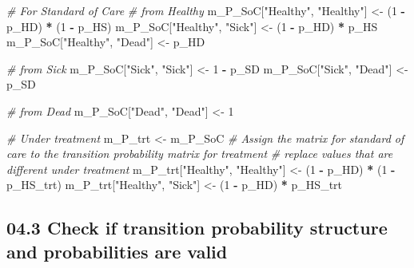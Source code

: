 \documentclass[
]{article}
\newenvironment{Shaded}{\begin{snugshade}}{\end{snugshade}}
\newcommand{\CommentTok}[1]{\textcolor[rgb]{0.56,0.35,0.01}{\textit{#1}}}
\newcommand{\DecValTok}[1]{\textcolor[rgb]{0.00,0.00,0.81}{#1}}
\newcommand{\NormalTok}[1]{#1}
\newcommand{\OperatorTok}[1]{\textcolor[rgb]{0.81,0.36,0.00}{\textbf{#1}}}
\newcommand{\StringTok}[1]{\textcolor[rgb]{0.31,0.60,0.02}{#1}}
\begin{document}
\begin{Shaded}
\begin{Highlighting}[]
\CommentTok{# For Standard of Care }
\CommentTok{# from Healthy}
\NormalTok{m_P_SoC[}\StringTok{"Healthy"}\NormalTok{, }\StringTok{"Healthy"}\NormalTok{] <-}\StringTok{ }\NormalTok{(}\DecValTok{1} \OperatorTok{-}\StringTok{ }\NormalTok{p_HD) }\OperatorTok{*}\StringTok{ }\NormalTok{(}\DecValTok{1} \OperatorTok{-}\StringTok{ }\NormalTok{p_HS)}
\NormalTok{m_P_SoC[}\StringTok{"Healthy"}\NormalTok{, }\StringTok{"Sick"}\NormalTok{]    <-}\StringTok{ }\NormalTok{(}\DecValTok{1} \OperatorTok{-}\StringTok{ }\NormalTok{p_HD) }\OperatorTok{*}\StringTok{ }\NormalTok{p_HS}
\NormalTok{m_P_SoC[}\StringTok{"Healthy"}\NormalTok{, }\StringTok{"Dead"}\NormalTok{]    <-}\StringTok{ }\NormalTok{p_HD}

\CommentTok{# from Sick}
\NormalTok{m_P_SoC[}\StringTok{"Sick"}\NormalTok{, }\StringTok{"Sick"}\NormalTok{] <-}\StringTok{ }\DecValTok{1} \OperatorTok{-}\StringTok{ }\NormalTok{p_SD}
\NormalTok{m_P_SoC[}\StringTok{"Sick"}\NormalTok{, }\StringTok{"Dead"}\NormalTok{] <-}\StringTok{ }\NormalTok{p_SD}

\CommentTok{# from Dead}
\NormalTok{m_P_SoC[}\StringTok{"Dead"}\NormalTok{, }\StringTok{"Dead"}\NormalTok{] <-}\StringTok{ }\DecValTok{1}

\CommentTok{# Under treatment}
\NormalTok{m_P_trt <-}\StringTok{ }\NormalTok{m_P_SoC  }\CommentTok{# Assign the matrix for standard of care to the transition probability matrix for treatment}
\CommentTok{# replace values that are different under treatment }
\NormalTok{m_P_trt[}\StringTok{"Healthy"}\NormalTok{, }\StringTok{"Healthy"}\NormalTok{] <-}\StringTok{ }\NormalTok{(}\DecValTok{1} \OperatorTok{-}\StringTok{ }\NormalTok{p_HD) }\OperatorTok{*}\StringTok{ }\NormalTok{(}\DecValTok{1} \OperatorTok{-}\StringTok{ }\NormalTok{p_HS_trt)}
\NormalTok{m_P_trt[}\StringTok{"Healthy"}\NormalTok{, }\StringTok{"Sick"}\NormalTok{]    <-}\StringTok{ }\NormalTok{(}\DecValTok{1} \OperatorTok{-}\StringTok{ }\NormalTok{p_HD) }\OperatorTok{*}\StringTok{ }\NormalTok{p_HS_trt}
\end{Highlighting}
\end{Shaded}

\hypertarget{check-if-transition-probability-structure-and-probabilities-are-valid}{%
\subsection{04.3 Check if transition probability structure and
probabilities are
valid}\label{check-if-transition-probability-structure-and-probabilities-are-valid}}
\end{document}
